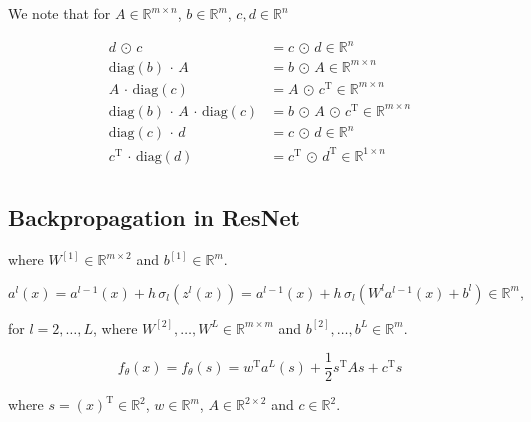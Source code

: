   






We note that for $A \in \mathbb{R}^{m \times n}$, $b \in \mathbb{R}^{m}$, $c, d \in \mathbb{R}^{n}$

\begin{align*}
    d \, \odot \, c &= c \, \odot \, d \in \mathbb{R}^{n} \\
    \mathrm{diag}(b) \, \cdot \, A &= b \, \odot \, A \in \mathbb{R}^{m \times n} \\
    A \, \cdot \, \mathrm{diag}(c) &= A \, \odot \, c^{\mathrm{T}} \in \mathbb{R}^{m \times n} \\
    \mathrm{diag}(b) \, \cdot \, A \, \cdot \, \mathrm{diag}(c) &= b \, \odot \, A \, \odot \, c^{\mathrm{T}} \in \mathbb{R}^{m \times n} \\
    \mathrm{diag}(c) \, \cdot \, d &= c \, \odot \, d \in \mathbb{R}^{n} \\
    c^{\mathrm{T}} \, \cdot \, \mathrm{diag}(d) &= c^{\mathrm{T}} \, \odot \, d^{\mathrm{T}} \in \mathbb{R}^{1 \times n} \\
\end{align*}







\subsection{Backpropagation in ResNet}



where $W^{[1]} \in \mathbb{R}^{m \times 2}$ and $b^{[1]} \in \mathbb{R}^{m}$.

\begin{equation*}
    a^{l}(x) = a^{l-1}(x) + h \, \sigma_{l} (z^{l}(x)) = a^{l-1}(x) + h \, \sigma_{l} (W^{l} a^{l-1}(x) + b^{l}) \in \mathbb{R}^{m}, 
\end{equation*}

for $l = 2, \ldots, L$, where $W^{[2]}, \ldots, W^{L} \in \mathbb{R}^{m \times m}$ and $b^{[2]}, \ldots, b^{L} \in \mathbb{R}^{m}$.

\begin{equation*}
    f_{\theta}(x) = f_{\theta}(s) = w^{\mathrm{T}} a^{L}(s) + \frac{1}{2} s^{\mathrm{T}} A s + c^{\mathrm{T}} s 
\end{equation*}

where $s = (x)^{\mathrm{T}} \in \mathbb{R}^{2}$, $w \in \mathbb{R}^{m}$, $A \in \mathbb{R}^{2 \times 2}$ and $c \in \mathbb{R}^2$.

